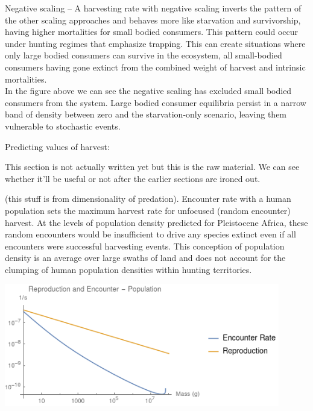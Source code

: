 \documentclass[]{rsos}%
\begin{document}
Negative scaling – A harvesting rate with negative scaling inverts the pattern of the other scaling approaches and behaves more like starvation and survivorship, having higher mortalities for small bodied consumers. This pattern could occur under hunting regimes that emphasize trapping. This can create situations where only large bodied consumers can survive in the ecosystem, all small-bodied consumers having gone extinct from the combined weight of harvest and intrinsic mortalities. \\


In the figure above we can see the negative scaling has excluded small bodied consumers from the system. Large bodied consumer equilibria persist in a narrow band of density between zero and the starvation-only scenario, leaving them vulnerable to stochastic events. 

\vspace{1.0cm}

Predicting values of harvest:

This section is not actually written yet but this is the raw material. We can see whether it'll be useful or not after the earlier sections are ironed out. 

(this stuff is from dimensionality of predation). 
Encounter rate with a human population sets the maximum harvest rate for unfocused (random encounter) harvest. At the levels of population density predicted for Pleistocene Africa, these random encounters would be insufficient to drive any species extinct even if all encounters were successful harvesting events. 
This conception of population density is an average over large swaths of land and does not account for the clumping of human population densities within hunting territories. \\

\vspace{0.5cm}

\includegraphics[width=0.9\textwidth]{pop_encounter_plot.png}\\
\end{document}
